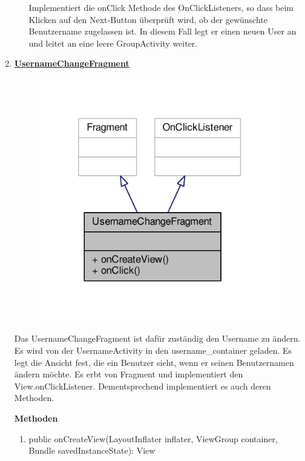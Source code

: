 \begin{enumerate}
\begin{enumerate}
		Implementiert die onClick Methode des OnClickListeners, so dass beim Klicken auf den Next-Button überprüft wird, ob der gewünschte Benutzername zugelassen ist. In diesem Fall legt er einen neuen User an und leitet an eine leere GroupActivity weiter.
	\end{enumerate}

	\item \textbf{\underline{UsernameChangeFragment}}
		
	\begin{figure}[H]
		\includegraphics[scale = 1]{res/username_change_fragment__inherit__graph.pdf}
		\centering
	\end{figure}
	Das UsernameChangeFragment ist dafür zuständig den Username zu ändern. Es wird von der UsernameActivity in den username\_container geladen. Es legt die Ansicht fest, die ein Benutzer sieht, wenn er seinen Benutzernamen ändern möchte. Es erbt von Fragment und implementiert den View.onClickListener. Dementsprechend implementiert es auch deren Methoden.
	
	\textbf{Methoden}
	
	\begin{enumerate}
		\item public onCreateView(LayoutInflater inflater, ViewGroup container, Bundle savedInstanceState): View
		

\end{enumerate}
\end{enumerate}
